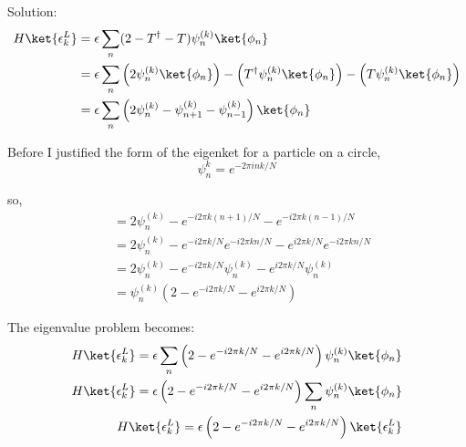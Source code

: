 \begin{homeworkProblem}
\begin{enumerate}[(a)]
\begin{callout}{Solution:}
                    \begin{align*}
                        H\ket{\epsilon_k^{L}} &= \epsilon \sum_n (2 - T^\dagger - T) \psi_n^{(k)}\ket{\phi_n} \\
                                              &= \epsilon \sum_n 
                                              \left( 2\psi_n^{(k)}\ket{\phi_n} \right)
                                              - \left( T^\dagger\psi_n^{(k)}\ket{\phi_n} \right) 
                                              - \left( T\psi_n^{(k)}\ket{\phi_n} \right) \\
                                              &= \epsilon \sum_n\left(2 \psi_n^{(k)}-\psi_{n+1}^{(k)}-\psi_{n-1}^{(k)}\right)\ket{\phi_n}
                    \end{align*}

                    Before I justified the form of the eigenket for a particle on a circle, 
                    $$\psi_n^{k} = e^{-2\pi i n k / N}$$

                    so,
                    \begin{align*}
                        &= 2\psi_n^{(k)} - e^{-i 2 \pi k (n+1) / N } - e^{-i 2 \pi k (n-1) /N} \\
                        &= 2\psi_n^{(k)} - e^{-i 2 \pi k / N }e^{-i 2 \pi k n / N } - e^{i 2 \pi k /N}e^{-i 2 \pi k n /N} \\
                        &= 2\psi_n^{(k)} - e^{-i 2 \pi k / N }\psi_n^{(k)} - e^{i 2 \pi k /N}\psi_n^{(k)} \\ 
                        &= \psi_n^{(k)} \left( 2 - e^{-i 2 \pi k / N } - e^{i 2 \pi k /N} \right)
                    \end{align*}

                    The eigenvalue problem becomes:
                    \begin{align*}
                        H\ket{\epsilon_k^{L}} = \epsilon \sum_n \left( 2 - e^{-i 2 \pi k / N } - e^{i 2 \pi k /N} \right) \psi_n^{(k)}\ket{\phi_n} \\
                        H\ket{\epsilon_k^{L}} = \epsilon\left( 2 - e^{-i 2 \pi k / N } - e^{i 2 \pi k /N} \right) \sum_n \psi_n^{(k)}\ket{\phi_n} \\
                        H\ket{\epsilon_k^{L}} = \epsilon\left( 2 - e^{-i 2 \pi k / N } - e^{i 2 \pi k /N} \right) \ket{\epsilon_k^{L}} \\
                    \end{align*}


\end{callout}
\end{enumerate}
\end{homeworkProblem}
